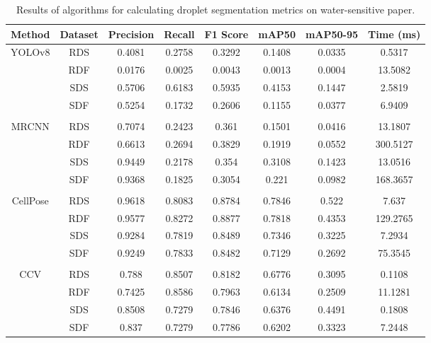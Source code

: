 
\begin{table}[h!]
\small
    \centering
    \caption{Results of algorithms for calculating droplet segmentation metrics on water-sensitive paper.}
    \label{tab:segmentation-metrics-drop}
    \begin{tabular}{cccccccc}
        \hline
        \textbf{Method} & \textbf{Dataset} & \textbf{Precision} & \textbf{Recall} & \textbf{F1 Score} & \textbf{mAP50} & \textbf{mAP50-95} & \textbf{Time (ms)}\\
        \hline
        \multirow{4}{2cm}[0em]{YOLOv8} & RDS & 0.4081 & 0.2758 & 0.3292 & 0.1408 & 0.0335 & 0.5317\\
        & RDF & 0.0176 & 0.0025 & 0.0043 & 0.0013 & 0.0004 & 13.5082\\
        & SDS & 0.5706 & 0.6183 & 0.5935 & 0.4153 & 0.1447 & 2.5819 \\
        & SDF & 0.5254 & 0.1732 & 0.2606 & 0.1155 & 0.0377 & 6.9409 \\

        \vspace{0.2cm}\\
        
        \multirow{4}{2cm}[0em]{MRCNN} & RDS & 0.7074 & 0.2423 & 0.361 & 0.1501 & 0.0416 & 13.1807\\
        & RDF & 0.6613 & 0.2694 & 0.3829 & 0.1919 & 0.0552 & 300.5127\\
        & SDS & 0.9449 & 0.2178 & 0.354 & 0.3108 & 0.1423 & 13.0516\\
        & SDF & 0.9368 & 0.1825 & 0.3054 & 0.221 & 0.0982 & 168.3657\\

        \vspace{0.2cm}\\
          
        \multirow{4}{2cm}[0em]{CellPose} & RDS & 0.9618 & 0.8083 & 0.8784 & 0.7846 & 0.522 & 7.637\\
        & RDF & 0.9577 & 0.8272 & 0.8877 & 0.7818 & 0.4353 & 129.2765\\
        & SDS & 0.9284 & 0.7819 & 0.8489 & 0.7346 & 0.3225 & 7.2934\\
        & SDF & 0.9249 & 0.7833 & 0.8482 & 0.7129 & 0.2692 & 75.3545\\

        \vspace{0.2cm}\\
          
        \multirow{4}{2cm}[0em]{CCV} & RDS & 0.788 & 0.8507 & 0.8182 & 0.6776 & 0.3095 & 0.1108\\
        & RDF & 0.7425 & 0.8586 & 0.7963 & 0.6134 & 0.2509 & 11.1281\\
        & SDS & 0.8508 & 0.7279 & 0.7846 & 0.6376 & 0.4491 & 0.1808\\
        & SDF & 0.837 & 0.7279 & 0.7786 & 0.6202 & 0.3323 & 7.2448\\

        \hline
    \end{tabular}
\end{table}
